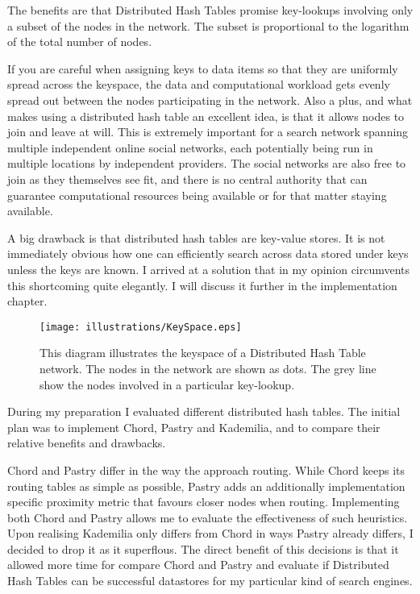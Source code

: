 The benefits are that Distributed Hash Tables promise key-lookups involving only a subset of the nodes in the network. The subset is proportional to the logarithm of the total number of nodes. 

If you are careful when assigning keys to data items so that they are uniformly spread across the keyspace, the data and computational workload gets evenly spread out between the nodes participating in the network. Also a plus, and what makes using a distributed hash table an excellent idea, is that it allows nodes to join and leave at will. This is extremely important for a search network spanning multiple independent online social networks, each potentially being run in multiple locations by independent providers. The social networks are also free to join as they themselves see fit, and there is no central authority that can guarantee computational resources being available or for that matter staying available.

A big drawback is that distributed hash tables are key-value stores. It is not immediately obvious how one can efficiently search across data stored under keys unless the keys are known. I arrived at a solution that in my opinion circumvents this shortcoming quite elegantly. I will discuss it further in the implementation chapter.

\begin{figure}[!htb]
\begin{center}
	\texttt{[image: illustrations/KeySpace.eps]}
\caption{This diagram illustrates the keyspace of a Distributed Hash Table network. The nodes in the network are shown as dots. The grey line show the nodes involved in a particular key-lookup.}
\label{keySpace}
\end{center}
\end{figure}

During my preparation I evaluated different distributed hash tables. The initial plan was to implement Chord, Pastry and Kademilia, and to compare their relative benefits and drawbacks. 

Chord and Pastry differ in the way the approach routing. While Chord keeps its routing tables as simple as possible, Pastry adds an additionally implementation specific proximity metric that favours closer nodes when routing. Implementing both Chord and Pastry allows me to evaluate the effectiveness of such heuristics. Upon realising Kademilia only differs from Chord in ways Pastry already differs, I decided to drop it as it superflous. The direct benefit of this decisions is that it allowed more time for compare Chord and Pastry and evaluate if Distributed Hash Tables can be successful datastores for my particular kind of search engines.

